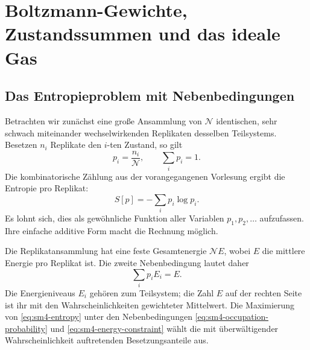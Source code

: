 \chapter{Boltzmann-Gewichte, Zustandssummen und das ideale Gas}


\section{Das Entropieproblem mit Nebenbedingungen}

Betrachten wir zunächst eine große Ansammlung von \(\mathcal N\) identischen, sehr schwach miteinander wechselwirkenden Replikaten desselben Teilsystems. Besetzen \(n_i\) Replikate den \(i\)-ten Zustand, so gilt
\begin{equation}
 p_i=\frac{n_i}{\mathcal N},
 \qquad
 \sum_i p_i=1.
 \label{eq:sm4-occupation-probability}
\end{equation}
Die kombinatorische Zählung aus der vorangegangenen Vorlesung ergibt die Entropie pro Replikat:
\begin{equation}
 S[p]=-\sum_i p_i\log p_i.
 \label{eq:sm4-entropy}
\end{equation}
Es lohnt sich, dies als gewöhnliche Funktion aller Variablen \(p_1,p_2,\ldots\) aufzufassen. Ihre einfache additive Form macht die Rechnung möglich.

Die Replikatansammlung hat eine feste Gesamtenergie \(\mathcal N E\), wobei \(E\) die mittlere Energie pro Replikat ist. Die zweite Nebenbedingung lautet daher
\begin{equation}
 \sum_i p_iE_i=E.
 \label{eq:sm4-energy-constraint}
\end{equation}
Die Energieniveaus \(E_i\) gehören zum Teilsystem; die Zahl \(E\) auf der rechten Seite ist ihr mit den Wahrscheinlichkeiten gewichteter Mittelwert. Die Maximierung von \eqref{eq:sm4-entropy} unter den Nebenbedingungen \eqref{eq:sm4-occupation-probability} und \eqref{eq:sm4-energy-constraint} wählt die mit überwältigender Wahrscheinlichkeit auftretenden Besetzungsanteile aus.

